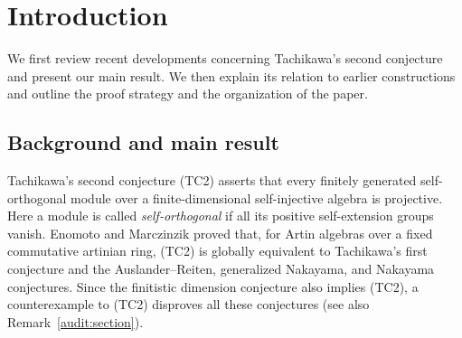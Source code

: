 \documentclass[11pt]{article}
\begin{document}
\begin{abstract}
We construct finite-dimensional symmetric algebras admitting nonprojective self-orthogonal modules from Frobenius algebras equipped with a module satisfying explicit stable and homological conditions. The resulting modules have complexity three, and their stable endomorphism algebras are isomorphic to the algebra of dual numbers over the ground field. The construction combines a variable input with a fixed auxiliary factor carrying the required twisting, and preserves the input through specified quotient and corner constructions. The proof combines derived induction, an obstruction to perfect factorization, and a cone construction over a Gorenstein triangular matrix algebra. For a symmetric algebra and a self-orthogonal generator, we describe the derived category of the opposite endomorphism algebra through a recollement with a two-term $2$-symmetric dg algebra. For our counterexamples, it is formal and quasi-isomorphic to an explicit four-dimensional dg algebra. Applications to cyclic coverings of a quantum exterior algebra yield connected examples with explicitly determined numbers of simple modules. The construction works over every field containing an element of infinite multiplicative order.
\end{abstract}


{\footnotesize\tableofcontents}
\clearpage

\section{Introduction}

We first review recent developments concerning Tachikawa's second
conjecture and present our main result. We then explain its relation to
earlier constructions and outline the proof strategy and the
organization of the paper.

\subsection{Background and main result}

Tachikawa's second conjecture (TC2) asserts that every finitely generated
self-orthogonal module over a finite-dimensional self-injective algebra
is projective. Here a module is called \emph{self-orthogonal} if all its
positive self-extension groups vanish. Enomoto and Marczinzik \cite{EM}
proved that, for Artin algebras over a fixed commutative artinian ring,
(TC2) is globally equivalent to
Tachikawa's first conjecture and the Auslander--Reiten, generalized
Nakayama, and Nakayama conjectures. Since the finitistic dimension
conjecture also implies (TC2), a counterexample to (TC2) disproves all
these conjectures (see also Remark~\ref{audit:section}).
\end{document}
